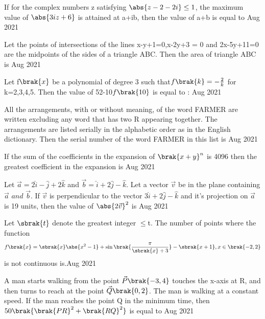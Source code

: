 \bigskip
\item If for the complex numbers z satisfying $\abs{z-2-2i}\leq 1$, the maximum value of $\abs{3iz+6}$ is attained at a+ib, then the value of a+b is equal to  \hfill{Aug 2021}
\bigskip
\item Let the points of intersections of the lines x-y+1=0,x-2y+3 = 0 and 2x-5y+11=0 are the midpoints of the sides of a triangle ABC. Then the area of triangle ABC is \hfill{Aug 2021}
\bigskip
\item Let f$\brak{x}$ be a polynomial of degree 3 such that$f\brak{k}=-\frac{2}{k}$ for k=2,3,4,5. Then the value of 52-10$f\brak{10}$ is equal to : \hfill{Aug 2021}
\bigskip
\item All the arrangements, with or without meaning, of the word FARMER are written excluding any word that has two R appearing together. The arrangements are listed serially in the alphabetic order as in the English dictionary. Then the serial number of the word FARMER in this list is \hfill{Aug 2021}
\bigskip
\item If the sum of the coefficients in the expansion of $\brak{x+y}^n$ is 4096 then the greatest coefficient in the expansion is \hfill{Aug 2021}
\bigskip
\item Let $\vec{a}= 2\hat{i}-\hat{j} +2\hat{k}$ and $\vec{b}=\hat{i}+ 2\hat{j}-\hat{k}$. Let a vector $\vec{v}$ be in the plane containing $\vec{a} \,\, and\,\, \vec{b}$. If $\vec{v}$ is perpendicular to the vector $3\hat{i}+2\hat{j}-\hat{k}$ and it's projection on $\vec{a}$ is 19 units, then the value of $\abs{2\vec{v}}^2$ is  \hfill{Aug 2021}
\bigskip
\item  Let $\sbrak{t}$ denote the greatest integer $\leq$t. The number of points where the function 
\begin{align*}
    f\brak{x}=\sbrak{x}\abs{x^2-1}+\sin{\brak{\frac{\pi}{\sbrak{x}+3}}}-\sbrak{x+1}, x\in\brak{-2,2}
\end{align*}
is not continuous is.\hfill{Aug 2021}
\bigskip
\item A man starts walking from the point $\vec{P}\brak{-3,4}$ touches the x-axis at R, and then turns to reach at the point $\vec{Q}\brak{0,2}$. The man is walking at a constant speed. If the man reaches the point Q in the minimum time, then $50\brak{\brak{PR}^2+\brak{RQ}^2}$ is equal to \hfill{Aug 2021}

